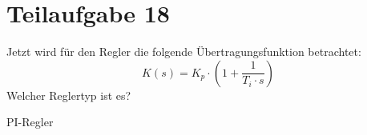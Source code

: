 \section{Teilaufgabe 18}
\begin{aufgabe}
    Jetzt wird für den Regler die folgende Übertragungsfunktion betrachtet:
    \[ K(s) = K_p \cdot \left(1 + \frac{1}{T_i \cdot s}\right) \]
    Welcher Reglertyp ist es?
\end{aufgabe}
PI-Regler
